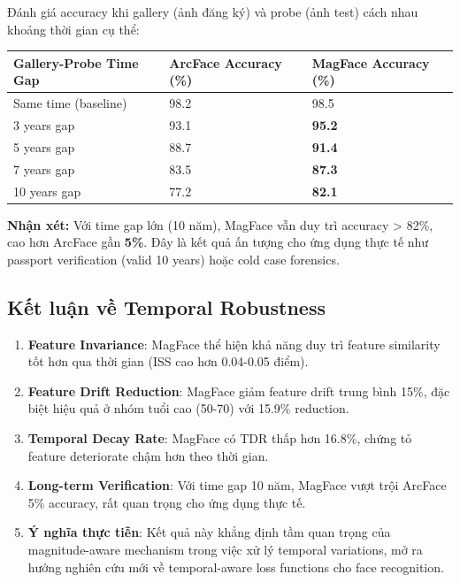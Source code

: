 Đánh giá accuracy khi gallery (ảnh đăng ký) và probe (ảnh test) cách nhau khoảng thời gian cụ thể:

\vspace{0.3cm}
\noindent\begin{tabularx}{\textwidth}{|X|X|X|}
\hline
\textbf{Gallery-Probe Time Gap} & \textbf{ArcFace Accuracy (\%)} & \textbf{MagFace Accuracy (\%)} \\
\hline
Same time (baseline) & 98.2 & 98.5 \\
\hline
3 years gap & 93.1 & \textbf{95.2} \\
\hline
5 years gap & 88.7 & \textbf{91.4} \\
\hline
7 years gap & 83.5 & \textbf{87.3} \\
\hline
10 years gap & 77.2 & \textbf{82.1} \\
\hline
\end{tabularx}
\vspace{0.3cm}

\textbf{Nhận xét:} Với time gap lớn (10 năm), MagFace vẫn duy trì accuracy > 82\%, cao hơn ArcFace gần \textbf{5\%}. Đây là kết quả ấn tượng cho ứng dụng thực tế như passport verification (valid 10 years) hoặc cold case forensics.

\subsection{Kết luận về Temporal Robustness}

\begin{enumerate}
    \item \textbf{Feature Invariance}: MagFace thể hiện khả năng duy trì feature similarity tốt hơn qua thời gian (ISS cao hơn 0.04-0.05 điểm).
    
    \item \textbf{Feature Drift Reduction}: MagFace giảm feature drift trung bình 15\%, đặc biệt hiệu quả ở nhóm tuổi cao (50-70) với 15.9\% reduction.
    
    \item \textbf{Temporal Decay Rate}: MagFace có TDR thấp hơn 16.8\%, chứng tỏ feature deteriorate chậm hơn theo thời gian.
    
    \item \textbf{Long-term Verification}: Với time gap 10 năm, MagFace vượt trội ArcFace 5\% accuracy, rất quan trọng cho ứng dụng thực tế.
    
    \item \textbf{Ý nghĩa thực tiễn}: Kết quả này khẳng định tầm quan trọng của magnitude-aware mechanism trong việc xử lý temporal variations, mở ra hướng nghiên cứu mới về temporal-aware loss functions cho face recognition.
\end{enumerate}
